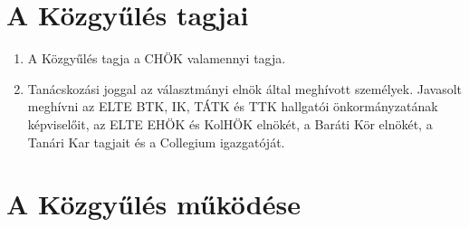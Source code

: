 \documentclass{rulebook}
\begin{document}
\section{A Közgyűlés tagjai}

\begin{enumerate}
	\item A Közgyűlés tagja a CHÖK valamennyi tagja.
	\item Tanácskozási joggal az választmányi elnök által meghívott személyek. Javasolt meghívni az ELTE BTK, IK, TÁTK és TTK hallgatói önkormányzatának képviselőit, az ELTE EHÖK és KolHÖK elnökét, a Baráti Kör elnökét, a Tanári Kar tagjait és a Collegium igazgatóját.
\end{enumerate}

\section{A Közgyűlés működése}
\end{document}
